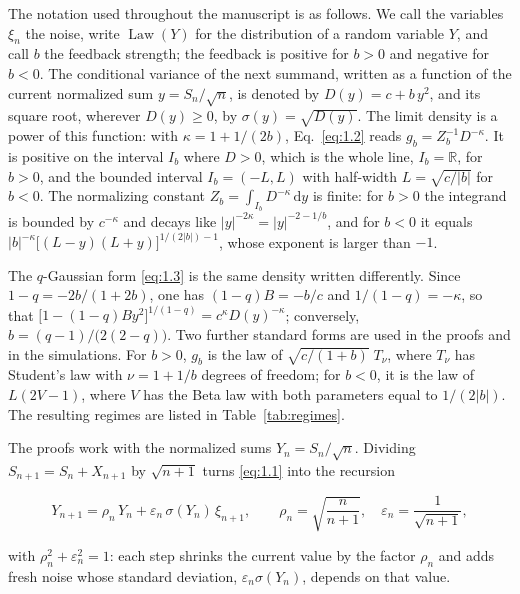 \documentclass[aip,jmp,preprint,onecolumn,floatfix,superscriptaddress,nofootinbib,11pt]{revtex4-2}
\theoremstyle{plain}
\theoremstyle{remark}
\numberwithin{equation}{section}
\newcommand{\dd}{\mathrm{d}}
\newcommand{\eps}{\varepsilon}
\newcommand{\Law}{\operatorname{Law}}
\begin{document}
The notation used throughout the manuscript is as follows. We call the variables $\xi_n$ the noise, write $\Law(Y)$ for the distribution of a random variable $Y$, and call $b$ the feedback strength; the feedback is positive for $b>0$ and negative for $b<0$. The conditional variance of the next summand, written as a function of the current normalized sum $y=S_n/\sqrt n$, is denoted by $D(y)=c+b\,y^{2}$, and its square root, wherever $D(y)\ge0$, by $\sigma(y)=\sqrt{D(y)}$. The limit density is a power of this function: with $\kappa=1+1/(2b)$, Eq.~\eqref{eq:1.2} reads $g_b=Z_b^{-1}D^{-\kappa}$. It is positive on the interval $I_b$ where $D>0$, which is the whole line, $I_b=\mathbb R$, for $b>0$, and the bounded interval $I_b=(-L,L)$ with half-width $L=\sqrt{c/|b|}$ for $b<0$. The normalizing constant $Z_b=\int_{I_b}D^{-\kappa}\,\dd y$ is finite: for $b>0$ the integrand is bounded by $c^{-\kappa}$ and decays like $|y|^{-2\kappa}=|y|^{-2-1/b}$, and for $b<0$ it equals $|b|^{-\kappa}\big[(L-y)(L+y)\big]^{1/(2|b|)-1}$, whose exponent is larger than $-1$.

The $q$-Gaussian form \eqref{eq:1.3} is the same density written differently. Since $1-q=-2b/(1+2b)$, one has $(1-q)B=-b/c$ and $1/(1-q)=-\kappa$, so that $\big[1-(1-q)By^{2}\big]^{1/(1-q)}=c^{\kappa}D(y)^{-\kappa}$; conversely, $b=(q-1)/\big(2(2-q)\big)$. Two further standard forms are used in the proofs and in the simulations. For $b>0$, $g_b$ is the law of $\sqrt{c/(1+b)}\;T_\nu$, where $T_\nu$ has Student's law with $\nu=1+1/b$ degrees of freedom; for $b<0$, it is the law of $L(2V-1)$, where $V$ has the Beta law with both parameters equal to $1/(2|b|)$. The resulting regimes are listed in Table~\ref{tab:regimes}.

The proofs work with the normalized sums $Y_n=S_n/\sqrt n$. Dividing $S_{n+1}=S_n+X_{n+1}$ by $\sqrt{n+1}$ turns \eqref{eq:1.1} into the recursion

\begin{equation}
Y_{n+1}=\rho_n\,Y_n+\eps_n\,\sigma(Y_n)\,\xi_{n+1},\qquad \rho_n=\sqrt{\frac{n}{n+1}},\quad \eps_n=\frac{1}{\sqrt{n+1}},
\label{eq:1.4}
\end{equation}

with $\rho_n^{2}+\eps_n^{2}=1$: each step shrinks the current value by the factor $\rho_n$ and adds fresh noise whose standard deviation, $\eps_n\sigma(Y_n)$, depends on that value.
\end{document}
